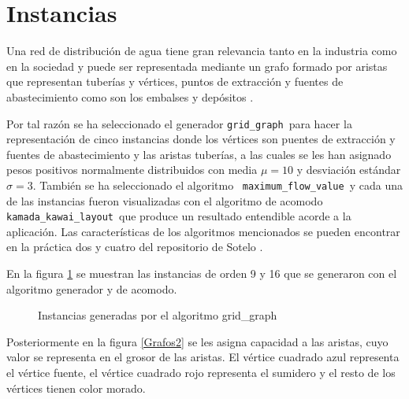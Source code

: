 \documentclass{article}
\begin{document}
\section{Instancias}
Una red de distribución de agua tiene gran relevancia tanto en la industria como en la sociedad y puede ser representada mediante un grafo formado por aristas que representan tuberías y vértices, puntos de extracción y fuentes de abastecimiento como son los embalses y depósitos \cite{red}. 

Por tal razón se ha seleccionado el generador \color{blue}\texttt{grid\_graph}\color{black}\ para hacer la representación de cinco instancias donde los vértices son puentes de extracción y fuentes de abastecimiento y las aristas tuberías, a las cuales se les han asignado pesos positivos normalmente distribuidos con media $\mu=10$ y desviación estándar $\sigma=3 $. También se ha seleccionado el algoritmo \ \color{blue}\texttt{maximum\_flow\_value}\color{black}\ y cada una de las instancias fueron visualizadas con el algoritmo de acomodo \color{blue}\texttt{kamada\_kawai\_layout}\color{black}\ que produce un resultado entendible acorde a la aplicación. Las características de los algoritmos mencionados se pueden encontrar en la práctica dos y cuatro del repositorio de Sotelo \cite{BYSB}.

En la figura \ref{Grafos1} se muestran las instancias de orden 9 y 16 que se generaron con el algoritmo generador y de acomodo. 


\begin{figure}[H]
\centering
{}\hspace{5mm}
\vspace{5mm}
\hspace{5mm}
\vspace{5mm}
\caption{Instancias generadas por el algoritmo grid\_graph} \label{Grafos1}
\end{figure}

\newpage
Posteriormente en la figura \ref{Grafos2} se les asigna capacidad a las aristas, cuyo valor se representa en el grosor de las aristas. El vértice cuadrado azul representa el vértice fuente, el vértice cuadrado rojo representa el sumidero y el resto de los vértices tienen color morado. 
\end{document}

